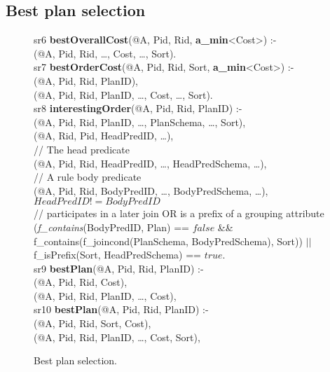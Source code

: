 \subsection{Best plan selection}
\label{ch:opt:sec:bestplan}

\begin{figure*}
\ssp
\centering
\begin{boxedminipage}{\linewidth}
sr6 {\bf bestOverallCost}(@A, Pid, Rid, {\small \bf a\_min}<Cost>) :- \\
(@A, Pid, Rid, \ldots, Cost, \ldots, Sort). \\

sr7 {\bf bestOrderCost}(@A, Pid, Rid, Sort, {\small \bf a\_min}<Cost>) :- \\
(@A, Pid, Rid, PlanID), \\
(@A, Pid, Rid, PlanID, \ldots, Cost, \ldots, Sort). \\

sr8 {\bf interestingOrder}(@A, Pid, Rid, PlanID) :- \\
(@A, Pid, Rid, PlanID, \ldots, PlanSchema, \ldots, Sort), \\
(@A, Rid, Pid, HeadPredID, \ldots), \\
\datalogspace // The head predicate \\
(@A, Pid, Rid, HeadPredID, \ldots, HeadPredSchema, \ldots),\\
\datalogspace // A rule body predicate \\
(@A, Pid, Rid, BodyPredID, \ldots, BodyPredSchema, \ldots),\\
\datalogspace $HeadPredID != BodyPredID$ \\
\datalogspace // participates in a later join OR is a prefix of a grouping attribute \\ 
\datalogspace ({\em f\_contains}(BodyPredID, Plan) ==  $false$ \&\& \\
\datalogspace f\_contains(f\_joincond(PlanSchema, BodyPredSchema), Sort)) $||$ \\
\datalogspace f\_isPrefix(Sort, HeadPredSchema) ==  $true$.  \\

sr9 {\bf bestPlan}(@A, Pid, Rid, PlanID) :- \\
(@A, Pid, Rid, Cost), \\
(@A, Pid, Rid, PlanID, \ldots, Cost), \\

sr10 {\bf bestPlan}(@A, Pid, Rid, PlanID) :- \\
(@A, Pid, Rid, Sort, Cost), \\
(@A, Pid, Rid, PlanID, \ldots, Cost, Sort), \\
\end{boxedminipage}
\caption{\label{ch:opt:fig:bestplan}Best plan selection.}
\end{figure*}

